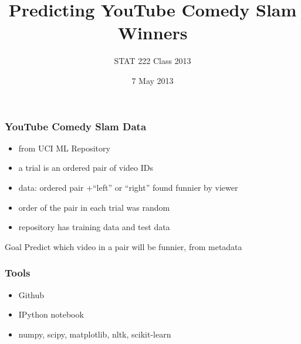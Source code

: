 \documentclass[fleqn]{beamer}
\begin{document}
\title[] %
{Predicting YouTube Comedy Slam Winners}

\author{STAT 222 Class 2013}


\date{7 May 2013 }
\subject{Statistical Machine Learning}


\begin{frame}
\titlepage
\end{frame}


\begin{frame}
\frametitle{YouTube Comedy Slam Data}

	\begin{itemize}
	   \item from UCI ML Repository
	   \item a trial is an ordered pair of video IDs
	   \item data: ordered pair $+$``left'' or ``right'' found funnier by viewer
	   \item order of the pair in each trial was random
	   \item repository has training data and test data
	\end{itemize}

	\begin{beamerboxesrounded}{Goal}
	    Predict which video in a pair will be funnier, from metadata
	\end{beamerboxesrounded}
\end{frame}

\begin{frame}
\frametitle{Tools}
   \begin{itemize}
        \item Github
        \item IPython notebook
        \item numpy, scipy, matplotlib, nltk, scikit-learn
   \end{itemize}

\end{frame}
\end{document}
